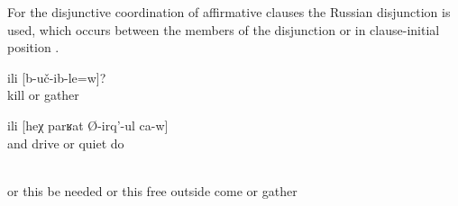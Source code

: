 For the disjunctive coordination of affirmative clauses the Russian disjunction  is used, which occurs between the members of the disjunction or in clause-initial position .
%
\begin{exe}
	\ex	\label{ex:‎‎‎Did they kill them or did they take them}
	\gll	[kax-ub-le=w]	ili	[b-uč-ib-le=w]?\\
		kill	or	gather\\
	\glt	{}

	\ex	\label{ex:‎And they stir him up or they calm him down}
		ili [heχ	parʁat	Ø-irq'-ul ca-w]\\
		and			drive		or		quiet	do	\\
	\glt	{}

	\ex	\label{ex:‎Or it must probably be this, or when he is set free, or when is taken (into prison)}
	\\
		or	this	be	needed		or	this	free outside	come	or	gather\\
	\glt	{}
\end{exe}
